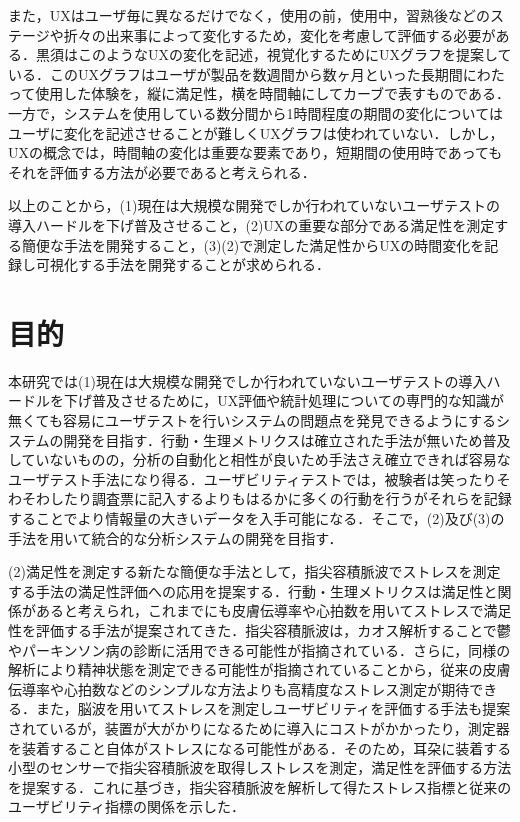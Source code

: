また，UXはユーザ毎に異なるだけでなく，使用の前，使用中，習熟後などのステージや折々の出来事によって変化するため，変化を考慮して評価する必要がある\cite{kurosu}．黒須はこのようなUXの変化を記述，視覚化するためにUXグラフ\cite{kurosu2015}を提案している．このUXグラフはユーザが製品を数週間から数ヶ月といった長期間にわたって使用した体験を，縦に満足性，横を時間軸にしてカーブで表すものである．一方で，システムを使用している数分間から1時間程度の期間の変化についてはユーザに変化を記述させることが難しくUXグラフは使われていない．しかし，UXの概念では，時間軸の変化は重要な要素であり，短期間の使用時であってもそれを評価する方法が必要であると考えられる．

以上のことから，(1)現在は大規模な開発でしか行われていないユーザテストの導入ハードルを下げ普及させること，(2)UXの重要な部分である満足性を測定する簡便な手法を開発すること，(3)(2)で測定した満足性からUXの時間変化を記録し可視化する手法を開発することが求められる．

\section{目的}

本研究では(1)現在は大規模な開発でしか行われていないユーザテストの導入ハードルを下げ普及させるために，UX評価や統計処理についての専門的な知識が無くても容易にユーザテストを行いシステムの問題点を発見できるようにするシステムの開発を目指す．行動・生理メトリクスは確立された手法が無いため普及していないものの，分析の自動化と相性が良いため手法さえ確立できれば容易なユーザテスト手法になり得る．ユーザビリティテストでは，被験者は笑ったりそわそわしたり調査票に記入するよりもはるかに多くの行動を行うがそれらを記録することでより情報量の大きいデータを入手可能になる\cite{tullis2014}．そこで，(2)及び(3)の手法を用いて統合的な分析システムの開発を目指す．

(2)満足性を測定する新たな簡便な手法として，指尖容積脈波でストレスを測定する手法の満足性評価への応用を提案する．行動・生理メトリクスは満足性と関係があると考えられ，これまでにも皮膚伝導率や心拍数を用いてストレスで満足性を評価する手法が提案されてきた．指尖容積脈波は，カオス解析することで鬱やパーキンソン病の診断に活用できる可能性が指摘されている\cite{tuan}\cite{oyama}．さらに，同様の解析により精神状態を測定できる可能性\cite{arai}が指摘されていることから，従来の皮膚伝導率や心拍数などのシンプルな方法よりも高精度なストレス測定が期待できる．また，脳波を用いてストレスを測定しユーザビリティを評価する手法\cite{amaral}も提案されているが，装置が大がかりになるために導入にコストがかかったり，測定器を装着すること自体がストレスになる可能性がある．そのため，耳朶に装着する小型のセンサーで指尖容積脈波を取得しストレスを測定，満足性を評価する方法を提案する．これに基づき，指尖容積脈波を解析して得たストレス指標と従来のユーザビリティ指標の関係を示した．

